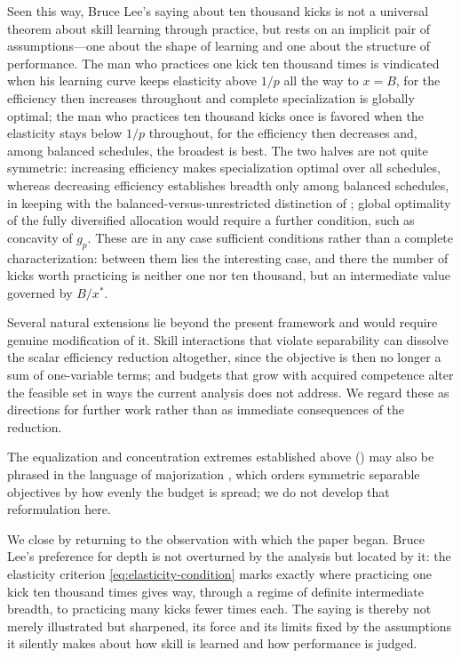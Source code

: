 \documentclass[11pt]{article}
\theoremstyle{definition}
\theoremstyle{remark}
\begin{document}
Seen this way, Bruce Lee's saying about ten thousand kicks is not a
universal theorem about skill learning through practice, but rests on
an implicit pair of assumptions---one about the shape of learning and
one about the structure of performance. The man who practices one kick
ten thousand times is vindicated when his learning curve keeps
elasticity above \(1/p\) all the way to \(x=B\), for the efficiency
then increases throughout and complete specialization is globally
optimal; the man who practices ten thousand kicks once is favored when
the elasticity stays below \(1/p\) throughout, for the efficiency then
decreases and, among balanced schedules, the broadest is best.  The two
halves are not quite symmetric: increasing efficiency makes
specialization optimal over all schedules, whereas decreasing
efficiency establishes breadth only among balanced schedules, in
keeping with the balanced-versus-unrestricted distinction of
; global optimality of the fully
diversified allocation would require a further condition, such as
concavity of \(g_p\). These are in any case sufficient conditions
rather than a complete characterization: between them lies the
interesting case, and there the number of kicks worth practicing is
neither one nor ten thousand, but an intermediate value governed by
\(B/x^*\).

Several natural extensions lie beyond the present framework and would
require genuine modification of it. Skill interactions that violate
separability can dissolve the scalar efficiency reduction altogether, since
the objective is then no longer a sum of one-variable terms; and budgets
that grow with acquired competence alter the feasible set in ways the
current analysis does not address. We regard these as directions for further
work rather than as immediate consequences of the reduction.

The equalization and concentration extremes established above
() may also be phrased in
the language of majorization \citep{marshall2011majorization}, which orders
symmetric separable objectives by how evenly the budget is spread; we do not
develop that reformulation here.

We close by returning to the observation with which the paper began.
Bruce Lee's preference for depth is not overturned by the analysis but
located by it: the elasticity criterion \eqref{eq:elasticity-condition}
marks exactly where practicing one kick ten thousand times gives way,
through a regime of definite intermediate breadth, to practicing many
kicks fewer times each. The saying is thereby not merely illustrated but
sharpened, its force and its limits fixed by the assumptions it silently
makes about how skill is learned and how performance is judged.
\end{document}
